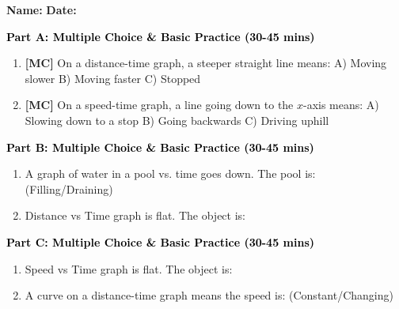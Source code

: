 \documentclass[12pt, letterpaper, fleqn]{article}
\newcommand{\blank}{\underline{\hspace{2.2cm}}}
\begin{document}
\textbf{Name:} \underline{\hspace{5cm}}
\hfill
\textbf{Date:} \underline{\hspace{3cm}}\\


\begin{tcolorbox}[colback=customteal!20]
\large\textcolor{black}{\textbf{Part A: Multiple Choice \& Basic Practice (30-45 mins)}}
\end{tcolorbox}

\vspace{3mm}

\begin{enumerate}[itemsep=2.5cm, leftmargin=0.6cm]
\item \textbf{[MC]} On a distance-time graph, a steeper straight line means:
A) Moving slower B) Moving faster C) Stopped
\item \textbf{[MC]} On a speed-time graph, a line going down to the $x$-axis means:
A) Slowing down to a stop B) Going backwards C) Driving uphill
\end{enumerate}

\newpage

\begin{tcolorbox}[colback=customteal!20]
\large\textcolor{black}{\textbf{Part B: Multiple Choice \& Basic Practice (30-45 mins)}}
\end{tcolorbox}

\vspace{3mm}

\begin{enumerate}[itemsep=2.5cm, leftmargin=0.6cm, resume]
\item A graph of water in a pool vs. time goes down. The pool is: \blank (Filling/Draining)
\item Distance vs Time graph is flat. The object is: \blank
\end{enumerate}

\newpage

\begin{tcolorbox}[colback=customteal!20]
\large\textcolor{black}{\textbf{Part C: Multiple Choice \& Basic Practice (30-45 mins)}}
\end{tcolorbox}

\vspace{3mm}

\begin{enumerate}[itemsep=2.5cm, leftmargin=0.6cm, resume]
\item Speed vs Time graph is flat. The object is: \blank
\item A curve on a distance-time graph means the speed is: \blank (Constant/Changing)
\end{enumerate}
\end{document}
